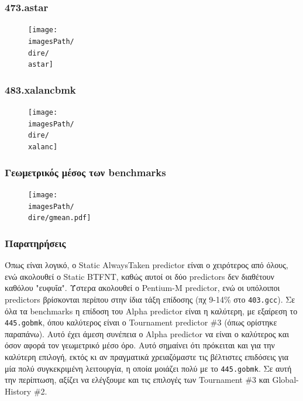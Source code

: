 \documentclass[12pt,a4paper]{article}
\newcommand{\imagesPath}{/home/nick/arch-ntua/ex02/graphs}
\newcommand{\astar}{473.astar.cslab_branch_predictors.out.pdf}
\newcommand{\xalanc}{483.xalancbmk.cslab_branch_predictors.out.pdf}
\newcommand{\dire}{4.5}
\begin{document}
		\subsubsection{473.astar}
			\begin{figure}[H]
				\begin{center}
					 \texttt{[image: \\imagesPath/\\dire/\\astar]}
				\end{center}
			\end{figure}
		
		\subsubsection{483.xalancbmk}
			\begin{figure}[H]
				\begin{center}
					 \texttt{[image: \\imagesPath/\\dire/\\xalanc]}
				\end{center}
			\end{figure}
		
		\subsubsection{Γεωμετρικός μέσος των benchmarks}
		
			\begin{figure}[H]
				\begin{center}
					\texttt{[image: \\imagesPath/\\dire/gmean.pdf]}
				\end{center}
			\end{figure}
		
		\subsubsection{Παρατηρήσεις}
			Όπως είναι λογικό, ο Static AlwaysTaken predictor είναι ο χειρότερος από όλους, ενώ ακολουθεί ο Static BTFNT, καθώς αυτοί οι δύο predictors δεν διαθέτουν καθόλου "ευφυΐα". Ύστερα ακολουθεί ο Pentium-M predictor, ενώ οι υπόλοιποι predictors βρίσκονται περίπου στην ίδια τάξη επίδοσης (πχ 9-14\% στο \verb|403.gcc|). Σε όλα τα benchmarks η επίδοση του Alpha predictor είναι η καλύτερη, με εξαίρεση το \verb|445.gobmk|, όπου καλύτερος είναι ο Tournament predictor \#3 (όπως ορίστηκε παραπάνω). Αυτό έχει άμεση συνέπεια ο Alpha predictor να είναι ο καλύτερος και όσον αφορά τον γεωμετρικό μέσο όρο. Αυτό σημαίνει ότι πρόκειται και για την καλύτερη επιλογή, εκτός κι αν πραγματικά χρειαζόμαστε τις βέλτιστες επιδόσεις για μία πολύ συγκεκριμένη λειτουργία, η οποία μοιάζει πολύ με το \verb|445.gobmk|. Σε αυτή την περίπτωση, αξίζει να ελέγξουμε και τις επιλογές των Tournament \#3 και Global-History \#2. \\
	
\end{document}
